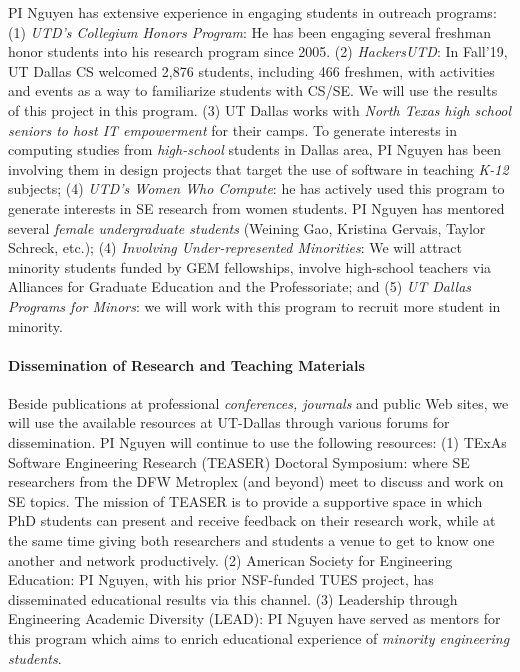 PI Nguyen has extensive experience in engaging students in
outreach programs: (1) {\em UTD's Collegium Honors Program}: He
has been engaging several freshman honor students into his research
program since 2005. (2) {\em HackersUTD}: In Fall'19, UT Dallas CS
welcomed 2,876 students, including 466 freshmen, with activities and
events as a way to familiarize students with CS/SE. We will use the
results of this project in this program.
%
(3) UT Dallas works with {\em North Texas high school seniors to host
IT empowerment} for their camps. To generate interests in computing
studies from {\em high-school} students in Dallas area, PI Nguyen has
been involving them in design projects that target the use of software
in teaching {\em K-12} subjects; (4) {\em UTD's Women Who Compute}: he
has actively used this program to generate interests in SE research
from women students. PI Nguyen has mentored several {\em female
undergraduate students} (Weining Gao, Kristina Gervais, Taylor
Schreck, etc.); (4) {\em Involving Under-represented Minorities}: We
will attract minority students funded by GEM fellowships, involve
high-school teachers via Alliances for Graduate Education and the
Professoriate; and (5) {\em UT Dallas Programs for Minors}: we will
work with this program to recruit more student in minority.


\paragraph{Dissemination of Research and Teaching Materials}

Beside publications at professional \emph{conferences, journals} and
public Web sites, we will use the available resources at UT-Dallas
through various forums for dissemination.
%
PI Nguyen will continue to use the following resources: (1) TExAs
Software Engineering Research (TEASER) Doctoral Symposium: where SE
researchers from the DFW Metroplex (and beyond) meet to discuss and
work on SE topics.  The mission of TEASER is to provide a supportive
space in which PhD students can present and receive feedback on their
research work, while at the same time giving both researchers and
students a venue to get to know one another and network productively.
(2) American Society for Engineering Education: PI Nguyen, with his
prior NSF-funded TUES project, has disseminated educational results
via this channel.
(3) Leadership through Engineering Academic Diversity (LEAD): PI
Nguyen have served as mentors for this program which aims to enrich
educational experience of {\em minority engineering students}.

